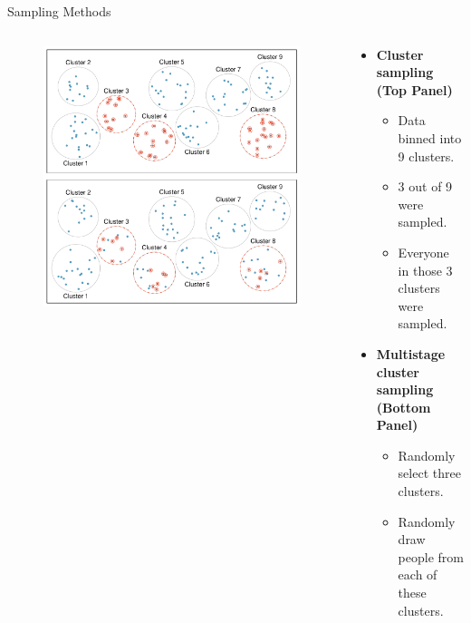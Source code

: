 \documentclass[notes,11pt, aspectratio=169]{beamer}
\begin{document}
\begin{frame}{Sampling Methods}
\begin{columns}
\begin{column}{.5\textwidth}
\begin{minipage}[c][.6\textheight][c]{\linewidth}
\begin{figure}
  \centering
  \includegraphics[scale=0.35]{graphs/cluster_multistage}
 \label{cluster_multistage}
\end{figure}
\end{minipage}
\end{column}

\hfill
\begin{column}{.5\textwidth}
\begin{minipage}[c][.6\textheight][c]{\linewidth}
\begin{itemize}
\item \textbf{Cluster sampling (Top Panel)}
        \begin{itemize}
        \item Data binned into 9 clusters.
        \item 3 out of 9 were sampled.
        \item Everyone in those 3 clusters were sampled.
        \end{itemize}
\item \textbf{Multistage cluster sampling (Bottom Panel)}
        \begin{itemize}
        \item Randomly select three clusters.
        \item Randomly draw people from each of these clusters.
        \end{itemize}
\end{itemize}
\end{minipage}
\end{column}
\end{columns}

\end{frame}
\end{document}

